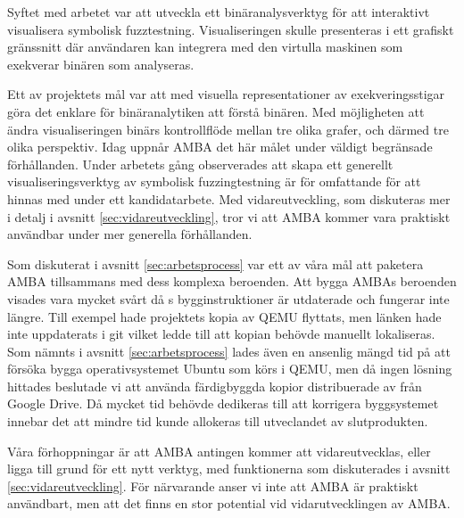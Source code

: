 Syftet med arbetet var att utveckla ett binäranalysverktyg för att interaktivt
visualisera symbolisk fuzztestning. Visualiseringen skulle presenteras i ett
grafiskt gränssnitt där användaren kan integrera med den virtulla maskinen som
exekverar binären som analyseras.

Ett av projektets mål var att med visuella representationer av exekveringsstigar
göra det enklare för binäranalytiken att förstå binären. Med möjligheten att
ändra visualiseringen binärs kontrollflöde mellan tre olika grafer, och därmed
tre olika perspektiv. Idag uppnår AMBA det här målet under väldigt begränsade
förhållanden. Under arbetets gång observerades att skapa ett generellt
visualiseringsverktyg av symbolisk fuzzingtestning är för omfattande för att
hinnas med under ett kandidatarbete. Med vidareutveckling, som diskuteras mer
i detalj i avsnitt \ref{sec:vidareutveckling}, tror vi att AMBA kommer vara
praktiskt användbar under mer generella förhållanden.

Som diskuterat i avsnitt \ref{sec:arbetsprocess} var ett av våra mål att
paketera AMBA tillsammans med dess komplexa beroenden. Att bygga AMBAs beroenden
visades vara mycket svårt då \stoe{}s bygginstruktioner är utdaterade och
fungerar inte längre. Till exempel hade \stoe{} projektets kopia av QEMU
flyttats, men länken hade inte uppdaterats i git vilket ledde till att kopian
behövde manuellt lokaliseras. Som nämnts i avsnitt \ref{sec:arbetsprocess} lades
även en ansenlig mängd tid på att försöka bygga operativsystemet Ubuntu som
körs i QEMU, men då ingen lösning hittades beslutade vi att använda färdigbyggda
kopior distribuerade av \stoe{} från Google Drive. Då mycket tid behövde
dedikeras till att korrigera byggsystemet innebar det att mindre tid kunde
allokeras till utveclandet av slutprodukten.

Våra förhoppningar är att AMBA antingen kommer att vidareutvecklas, eller ligga
till grund för ett nytt verktyg, med funktionerna som diskuterades i avsnitt
\ref{sec:vidareutveckling}. För närvarande anser vi inte att AMBA är praktiskt
användbart, men att det finns en stor potential vid vidarutvecklingen av AMBA.